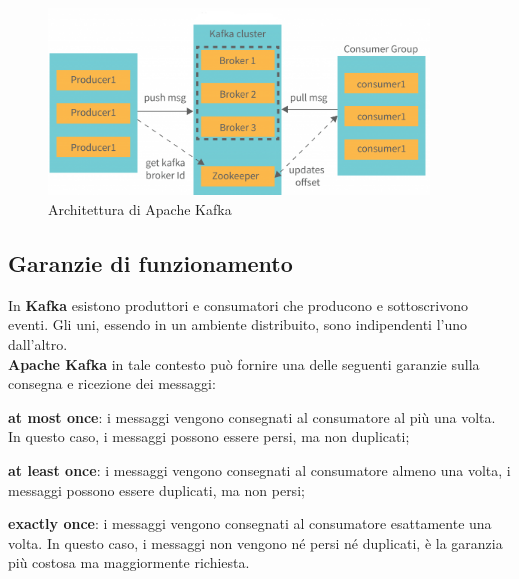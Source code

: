 \begin{figure}[h]
    \centering
    \includegraphics[width=0.9\textwidth]{images/componenti/kafka_architetcture.png}
    \caption{Architettura di Apache Kafka}
    \label{fig:kafka_architecture}
\end{figure}

\subsection{Garanzie di funzionamento}
In \textbf{Kafka} esistono produttori e consumatori che producono e sottoscrivono eventi. Gli uni, essendo in un ambiente distribuito,
sono indipendenti l’uno dall’altro. \\
\textbf{Apache Kafka} in tale contesto può fornire una delle seguenti garanzie sulla consegna e ricezione dei messaggi:
\begin{list}{*}
    \item \textbf{at most once}: i messaggi vengono consegnati al consumatore al più una volta. In questo caso, i messaggi possono essere persi, ma non duplicati;
   \item \item  \textbf{at least once}: i messaggi vengono consegnati al consumatore almeno una volta, i messaggi possono essere duplicati, ma non persi;
    \item \textbf{exactly once}: i messaggi vengono consegnati al consumatore esattamente una volta. In questo caso, i messaggi non vengono né persi né duplicati, è la garanzia più costosa ma maggiormente richiesta.
\end{list}
